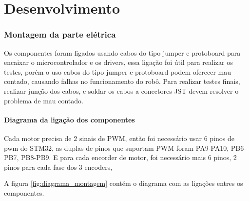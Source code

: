 

\chapter{Desenvolvimento}


\subsection{Montagem da parte elétrica}

Os componentes foram ligados usando cabos do tipo jumper e protoboard para encaixar o microcontrolador e os drivers,
essa ligação foi útil para realizar os testes, porém o uso cabos do tipo jumper e protoboard podem oferecer mau contado, causando falhas no funcionamento do robô.
Para realizar testes finais, realizar junção dos cabos, e soldar os cabos a conectores JST devem resolver o problema de mau contado.


\subsubsection{Diagrama da ligação dos componentes}
Cada motor precisa de 2 sinais de PWM, então foi necessário usar 6 pinos de pwm do STM32, as duplas de pinos que suportam PWM foram PA9-PA10, PB6-PB7, PB8-PB9.
E para cada encorder de motor, foi necessário mais 6 pinos, 2 pinos para cada fase dos 3 encoders,

A figura \ref{fig:diagrama_montagem} contém o diagrama com as ligações entres os componentes.


